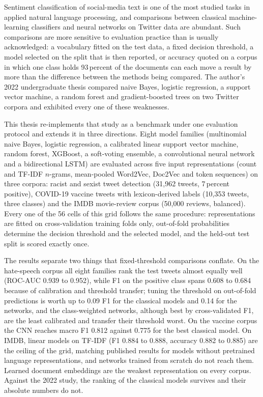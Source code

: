 Sentiment classification of social-media text is one of the most studied tasks in applied natural language processing, and comparisons between classical machine-learning classifiers and neural networks on Twitter data are abundant. Such comparisons are more sensitive to evaluation practice than is usually acknowledged: a vocabulary fitted on the test data, a fixed decision threshold, a model selected on the split that is then reported, or accuracy quoted on a corpus in which one class holds 93\,percent of the documents can each move a result by more than the difference between the methods being compared. The author's 2022 undergraduate thesis compared naive Bayes, logistic regression, a support vector machine, a random forest and gradient-boosted trees on two Twitter corpora and exhibited every one of these weaknesses.

This thesis re-implements that study as a benchmark under one evaluation protocol and extends it in three directions. Eight model families (multinomial naive Bayes, logistic regression, a calibrated linear support vector machine, random forest, XGBoost, a soft-voting ensemble, a convolutional neural network and a bidirectional LSTM) are evaluated across five input representations (count and TF-IDF $n$-grams, mean-pooled Word2Vec, Doc2Vec and token sequences) on three corpora: racist and sexist tweet detection (31,962 tweets, 7\,percent positive), COVID-19 vaccine tweets with lexicon-derived labels (10,353 tweets, three classes) and the IMDB movie-review corpus (50,000 reviews, balanced). Every one of the 56 cells of this grid follows the same procedure: representations are fitted on cross-validation training folds only, out-of-fold probabilities determine the decision threshold and the selected model, and the held-out test split is scored exactly once.

The results separate two things that fixed-threshold comparisons conflate. On the hate-speech corpus all eight families rank the test tweets almost equally well (ROC-AUC 0.939 to 0.952), while F1 on the positive class spans 0.608 to 0.684 because of calibration and threshold transfer; tuning the threshold on out-of-fold predictions is worth up to 0.09 F1 for the classical models and 0.14 for the networks, and the class-weighted networks, although best by cross-validated F1, are the least calibrated and transfer their threshold worst. On the vaccine corpus the CNN reaches macro F1 0.812 against 0.775 for the best classical model. On IMDB, linear models on TF-IDF (F1 0.884 to 0.888, accuracy 0.882 to 0.885) are the ceiling of the grid, matching published results for models without pretrained language representations, and networks trained from scratch do not reach them. Learned document embeddings are the weakest representation on every corpus. Against the 2022 study, the ranking of the classical models survives and their absolute numbers do not.

